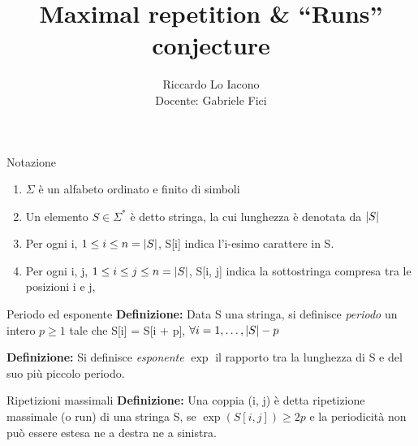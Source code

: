 \documentclass{beamer}
\title{Maximal repetition \& ``Runs'' conjecture}
\author{Riccardo Lo Iacono \\ \footnotesize{Docente: Gabriele Fici}}
\begin{document}
    \begin{frame}
        \maketitle
    \end{frame}

    \begin{frame}{Notazione}
        \begin{enumerate}
            \item \(\Sigma\) è un alfabeto ordinato e finito di simboli
            \item Un elemento \(S \in \Sigma^{*}\) è detto stringa,
                la cui lunghezza è denotata da \(\left\lvert S \right\rvert\)
            \item Per ogni i, \(1 \le i \le n = \left\lvert S \right\rvert\), 
                S[i] indica l'i-esimo carattere in S.
            \item Per ogni i, j, \(1 \le i \le j \le n = \left\lvert S \right\rvert\),
                S[i, j] indica la sottostringa compresa tra le 
                posizioni i e j, 
        \end{enumerate}
    \end{frame}

    \begin{frame}{Periodo ed esponente}
        \textbf{Definizione: } Data S una stringa,
        si definisce \emph{periodo} un intero \(p \ge 1\)
        tale che S[i] = S[i + p], \(\forall i = 1, \ldots, \left\lvert S \right\rvert - p\)

        \textbf{Definizione: } Si definisce \emph{esponente} \(\exp\)
        il rapporto tra la lunghezza di S e del suo più piccolo periodo.
    \end{frame}

    \begin{frame}{Ripetizioni massimali}
        \textbf{Definizione: } Una coppia (i, j) è detta ripetizione massimale
        (o run) di una stringa S, se \(\exp(S[i, j]) \ge 2p\) e la periodicità
        non può essere estesa ne a destra ne a sinistra.
    \end{frame}
\end{document}
